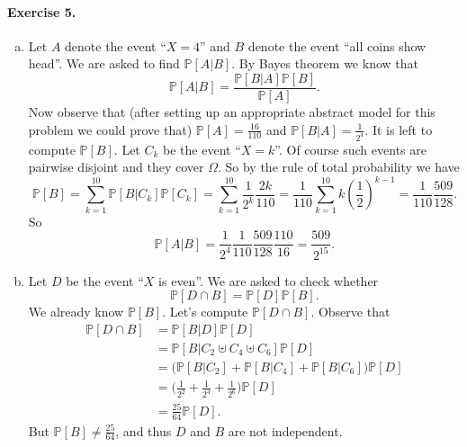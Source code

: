 \documentclass[12pt,a4paper]{report}
\theoremstyle{definition}
\theoremstyle{num.custom-title}
\renewcommand{\1}{\mathbbm{1}}
\renewcommand{\P}{\mathbb{P}}
\begin{document}
\paragraph{Exercise 5.}
\begin{enumerate}[(a)]
\item Let $A$ denote the event ``$X=4$'' and $B$ denote the event ``all coins show head''. We are asked to find $\P[A|B]$. By Bayes theorem we know that
\[
\P[A|B] = \frac{\P[B|A] \P[B]}{\P[A]}.
\]
Now observe that (after setting up an appropriate abstract model for this problem we could prove that) $\P[A] = \frac{16}{110}$ and $\P[B|A] = \frac{1}{2^4}$. It is left to compute $\P[B]$. Let $C_k$ be the event ``$X=k$''. Of course such events are pairwise disjoint and they cover $\Omega$. So by the rule of total probability we have
\[
\P[B] = \sum_{k=1}^{10} \P[B|C_k] \P[C_k] = \sum_{k=1}^{10} \frac{1}{2^k} \frac{2k}{110} = \frac{1}{110} \sum_{k=1}^{10} k \left( \frac{1}{2} \right)^{k-1} = \frac{1}{110} \frac{509}{128}.
\]
So
\[
\P[A|B] = \frac{1}{2^4} \frac{1}{110} \frac{509}{128} \frac{110}{16} = \frac{509}{2^{15}}.
\]
\item Let $D$ be the event ``$X$ is even''. We are asked to check whether
\[
\P[D \cap B] = \P[D] \P[B].
\]
We already know $\P[B]$. Let's compute $\P[D \cap B]$. Observe that
\begin{align*}
\P[D \cap B] 
&= \P[B|D] \P[D] \\
&= \P[B | C_2 \uplus C_4 \uplus C_6] \P[D] \\ 
&= \Big( \P[B | C_2] + \P[B | C_4] + \P[B | C_6] \Big) \P[D] \tag{immediate to check} \\
&= \Big( \frac{1}{2^2} + \frac{1}{2^4} + \frac{1}{2^6} \Big) \P[D] \\
&= \frac{25}{64} \P[D].
\end{align*}
But $\P[B] \neq \frac{25}{64}$, and thus $D$ and $B$ are not independent.
\end{enumerate}
\end{document}
